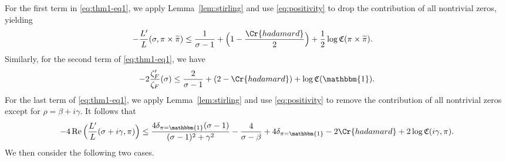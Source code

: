 \documentclass[12pt,reqno]{amsart}
\renewcommand{\tilde}{\widetilde}
\theoremstyle{remark}
\renewcommand{\tilde}{\widetilde}
\DeclareMathOperator{\Real}{Re}
\renewcommand{\tilde}{\widetilde}
\numberwithin{equation}{section}
\begin{document}
	For the first term in \eqref{eq:thm1-eq1}, we apply Lemma~\ref{lem:stirling} and use \eqref{eq:positivity} to drop the contribution of all nontrivial zeros, yielding 
	\begin{equation}
		\label{eq:cuspform-term1-2}
		\begin{aligned}
			-\frac{L'}{L}(\sigma, \pi \times \tilde{\pi}) %
			&\le \frac{1}{\sigma-1}
			+\Big(1 -\frac{\Cr{hadamard}}{2}\Big)+\frac{1}{2}\log \mathfrak{C}(\pi \times \tilde{\pi}).
		\end{aligned}
	\end{equation}	
	Similarly, for the second term of \eqref{eq:thm1-eq1}, we have 
	\begin{equation}
		\label{eq:cuspform-term2}
		-2\frac{\zeta_F'}{\zeta_F}(\sigma) \le  \frac{2}{\sigma-1}+(2-\Cr{hadamard})
		+ \log  \mathfrak{C}( \mathbbm{1}).
	\end{equation}
    For the last term of \eqref{eq:thm1-eq1}, we apply Lemma~\ref{lem:stirling} and use \eqref{eq:positivity}
	to remove the contribution of all nontrivial zeros except for $\rho=\beta+i\gamma$. It follows that
	\begin{equation}
		\label{eq:cuspform-term4}
		-4\Real\Big(\frac{L'}{L}(\sigma+i\gamma, \pi)\Big)\le \frac{4\delta_{\pi = \mathbbm{1}}(\sigma-1)}{(\sigma-1)^2+\gamma^2} - \frac{4}{\sigma-\beta}+4\delta_{\pi = \mathbbm{1}}-2\Cr{hadamard}
		+ 2\log \mathfrak{C}(i\gamma, \pi).
	\end{equation}
	We then consider the following two cases.
\end{document}
